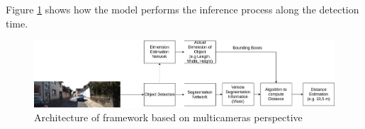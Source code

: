 Figure \ref{fig:networkBehavior} shows how the model performs the inference process along the detection time.  

\begin{figure}[H]
\centering
\includegraphics[width=\textwidth]{imagens/Network Behavior.png}
\caption{Architecture of framework based on multicameras perspective}
\label{fig:networkBehavior}
\end{figure}